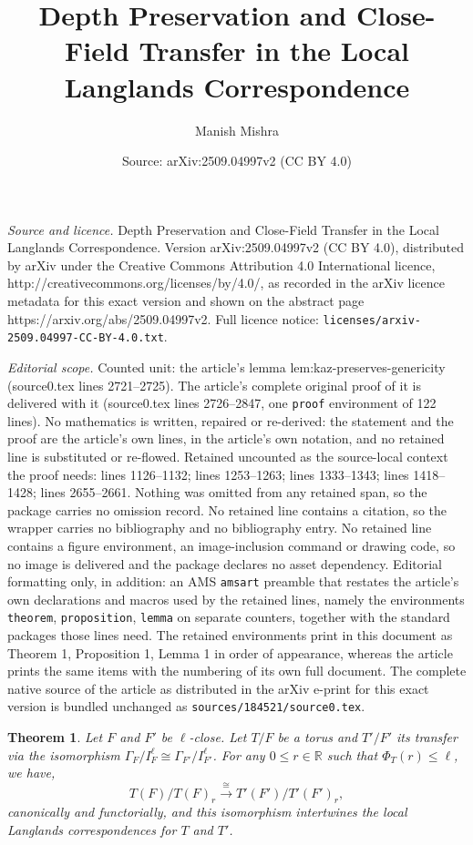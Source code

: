 \documentclass[10pt,a4paper]{amsart}
\title{Depth Preservation and Close-Field Transfer in the Local Langlands Correspondence}
\author{Manish Mishra}
\date{Source: arXiv:2509.04997v2 (CC BY 4.0)}
\newtheorem{theorem}{Theorem}
\begin{document}
\maketitle

\noindent\emph{Source and licence.} Depth Preservation and Close-Field Transfer in the Local Langlands Correspondence. Version arXiv:2509.04997v2 (CC BY 4.0), distributed by arXiv under the Creative Commons Attribution 4.0 International licence, http://creativecommons.org/licenses/by/4.0/, as recorded in the arXiv licence metadata for this exact version and shown on the abstract page https://arxiv.org/abs/2509.04997v2. Full licence notice: \texttt{licenses/arxiv-2509.04997-CC-BY-4.0.txt}.\par\smallskip

\noindent\textit{Editorial scope.} Counted unit: the article's lemma lem:kaz-preserves-genericity (source0.tex lines 2721--2725). The article's complete original proof of it is delivered with it (source0.tex lines 2726--2847, one \texttt{proof} environment of 122 lines). No mathematics is written, repaired or re-derived: the statement and the proof are the article's own lines, in the article's own notation, and no retained line is substituted or re-flowed.  Retained uncounted as the source-local context the proof needs: lines 1126--1132; lines 1253--1263; lines 1333--1343; lines 1418--1428; lines 2655--2661.  Nothing was omitted from any retained span, so the package carries no omission record.  No retained line contains a citation, so the wrapper carries no bibliography and no bibliography entry.  No retained line contains a figure environment, an image-inclusion command or drawing code, so no image is delivered and the package declares no asset dependency.  Editorial formatting only, in addition: an AMS \texttt{amsart} preamble that restates the article's own declarations and macros used by the retained lines, namely the environments \texttt{theorem}, \texttt{proposition}, \texttt{lemma} on separate counters, together with the standard packages those lines need.  The retained environments print in this document as Theorem 1, Proposition 1, Lemma 1 in order of appearance, whereas the article prints the same items with the numbering of its own full document.  The complete native source of the article as distributed in the arXiv e-print for this exact version is bundled unchanged as \texttt{sources/184521/source0.tex}.
\begin{theorem}\label{thm:congruent-isom}
Let $F$ and $F'$ be $\ell$-close. Let $T/F$ be a torus and $T'/F'$ its transfer via the isomorphism $\Gamma_{F}/I_{F}^{\ell}\cong\Gamma_{F'}/I_{F'}^{\ell}$. For any $0\leq r\in \mathbb{R}$ such that $\Phi_T(r)\leq \ell$, we have,
\[
T(F)/T(F)_{r} \xrightarrow{\;\cong\;} T'(F')/T'(F')_{r},
\]
canonically and functorially, and this isomorphism intertwines the local Langlands correspondences for $T$ and $T'$. 
\end{theorem}
\end{document}
